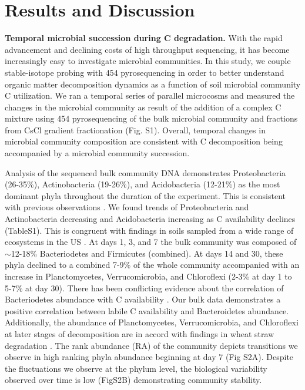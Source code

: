 \section{Results and Discussion}


\textbf{Temporal microbial succession during C degradation.} With the rapid advancement and declining costs of high throughput sequencing, it has become increasingly easy to investigate microbial communities. In this study, we couple stable-isotope probing with 454 pyrosequencing in order to better understand organic matter decomposition dynamics as a function of soil microbial community C utilization. We ran a temporal series of parallel microcosms and measured the changes in the microbial community as result of the addition of a complex C mixture using 454 pyrosequencing of the bulk microbial community and fractions from CsCl gradient fractionation (Fig. S1). Overall, temporal changes in microbial community composition are consistent with C decomposition being accompanied by a microbial community succession. 

Analysis of the sequenced bulk community DNA demonstrates Proteobacteria (26-35\%), Actinobacteria (19-26\%), and Acidobacteria (12-21\%) as the most dominant phyla throughout the duration of the experiment. This is consistent with previous observations \cite{Goldfarb_2011,Fierer_2007,Rui_2009,Fierer_2012}. We found trends of Proteobacteria and Actinobacteria decreasing and Acidobacteria increasing as C availability declines (TableS1). This is congruent with findings in soils sampled from a wide range of ecosystems in the US \cite{Fierer_2007}. At days 1, 3, and 7 the bulk community was composed of $\sim$12-18\% Bacteriodetes and Firmicutes (combined).  At days 14 and 30, these phyla declined to a combined 7-9\% of the whole community accompanied with an increase in Planctomycetes, Verrucomicrobia, and Chloroflexi (2-3\% at day 1 to 5-7\% at day 30). There has been conflicting evidence about the correlation of Bacteriodetes abundance with C availability \cite{Fierer_2007,Rui_2009,Sharp_2000,L_pez_Lozano_2013,Bastian_2009}. Our bulk data demonstrates a positive correlation between labile C availability and Bacteroidetes abundance. Additionally, the abundance of Planctomycetes, Verrucomicrobia, and Chloroflexi at later stages of decomposition are in accord with findings in wheat straw degradation \cite{Bastian_2009}. The rank abundance (RA) of the community depicts transitions we observe in high ranking phyla abundance beginning at day 7 (Fig S2A). Despite the fluctuations we observe at the phylum level, the biological variability observed over time is low (FigS2B) demonstrating community stability.   

